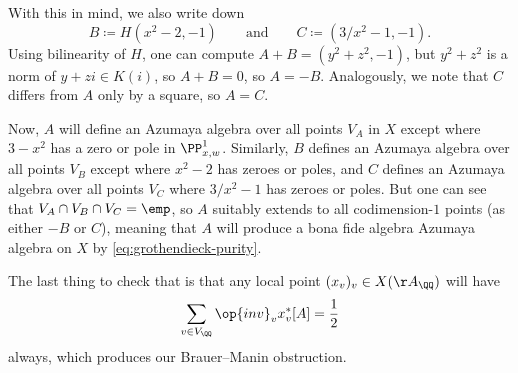 \documentclass[../notes.tex]{subfiles}
\begin{document}
\begin{itemize}
	With this in mind, we also write down
	\[B\coloneqq H\left(x^2-2,-1\right)\qquad\text{and}\qquad C\coloneqq\left(3/x^2-1,-1\right).\]
	Using bilinearity of $H$, one can compute $A+B=\left(y^2+z^2,-1\right)$, but $y^2+z^2$ is a norm of $y+zi\in K(i)$, so $A+B=0$, so $A=-B$. Analogously, we note that $C$ differs from $A$ only by a square, so $A=C$.

	Now, $A$ will define an Azumaya algebra over all points $V_A$ in $X$ except where $3-x^2$ has a zero or pole in $\PP^1_{x,w}$. Similarly, $B$ defines an Azumaya algebra over all points $V_B$ except where $x^2-2$ has zeroes or poles, and $C$ defines an Azumaya algebra over all points $V_C$ where $3/x^2-1$ has zeroes or poles. But one can see that $V_A\cap V_B\cap V_C=\emp$, so $A$ suitably extends to all codimension-$1$ points (as either $-B$ or $C$), meaning that $A$ will produce a bona fide algebra Azumaya algebra on $X$ by \eqref{eq:grothendieck-purity}.

	The last thing to check that is that any local point $(x_v)_v\in X(\AA_\QQ)$ will have
	\[\sum_{v\in V_\QQ}\op{inv}_vx_v^*[A]=\frac12\]
	always, which produces our Brauer--Manin obstruction.
\end{itemize}
\end{document}

